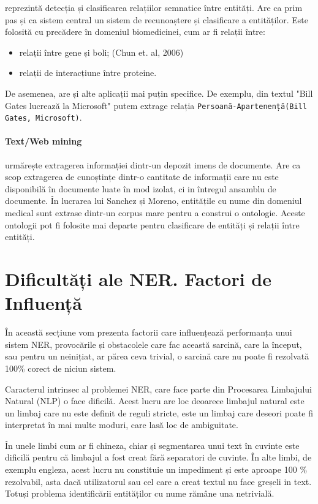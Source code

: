 reprezintă detecția și clasificarea relațiilor semnatice între entități. Are ca prim pas și ca sistem central un sistem de recunoaștere și clasificare a entităților. Este folosită cu precădere în domeniul biomedicinei, cum ar fi relații între:

\begin{itemize}
\item relații între gene și boli; (Chun et. al, 2006)\cite{Chun06extractionof}
\item relații de interacțiune între proteine.
\end{itemize}

De asemenea, are și alte aplicații mai puțin specifice. De exemplu, din textul "Bill Gates lucrează la Microsoft" putem extrage relația \texttt{Persoană-Apartenență(Bill Gates, Microsoft)}.

\paragraph{Text/Web mining}

urmărește extragerea informației dintr-un depozit imens de documente. Are ca scop extragerea de cunoștințe dintr-o cantitate de informații care nu este disponibilă în documente luate în mod izolat, ci in întregul ansamblu de documente. În lucrarea lui Sanchez și Moreno, entitățile cu nume din domeniul medical sunt extrase dintr-un corpus mare pentru a construi o ontologie. Aceste ontologii pot fi folosite mai departe pentru clasificare de entități și relații între entități.\cite{sanchez2005}

\section{Dificultăți ale NER. Factori de Influență}

În această secțiune vom prezenta factorii care influențează performanța unui sistem NER, provocările și obstacolele care fac această sarcină, care la început, sau pentru un neinițiat, ar părea ceva trivial, o sarcină care nu poate fi rezolvată 100\% corect de niciun sistem.


Caracterul intrinsec al problemei NER, care face parte din Procesarea Limbajului Natural (NLP) o face dificilă. Acest lucru are loc deoarece limbajul natural este un limbaj care nu este definit de reguli stricte, este un limbaj care deseori poate fi interpretat în mai multe moduri, care lasă loc de ambiguitate.

În unele limbi cum ar fi chineza, chiar și segmentarea unui text în cuvinte este dificilă pentru că limbajul a fost creat fără separatori de cuvinte. În alte limbi, de exemplu engleza, acest lucru nu constituie un impediment și este aproape 100 \% rezolvabil, asta dacă utilizatorul sau cel care a creat textul nu face greșeli in text. Totuși problema identificării entităților cu nume rămâne una netrivială.

